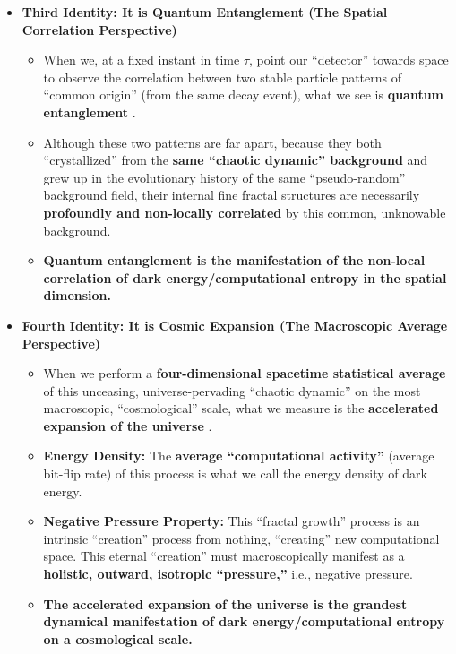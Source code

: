 \documentclass[11pt, a4paper]{article}
\begin{document}
\begin{itemize}
    \item \textbf{Third Identity: It is Quantum Entanglement (The Spatial Correlation Perspective)}
    \begin{itemize}
        \item When we, at a fixed instant in time $\tau$, point our ``detector'' towards space to observe the correlation between two stable particle patterns of ``common origin'' (from the same decay event), what we see is \textbf{quantum entanglement} \cite{Bell1964}.
        \item Although these two patterns are far apart, because they both ``crystallized'' from the \textbf{same ``chaotic dynamic'' background} and grew up in the evolutionary history of the same ``pseudo-random'' background field, their internal fine fractal structures are necessarily \textbf{profoundly and non-locally correlated} by this common, unknowable background.
        \item \textbf{Quantum entanglement is the manifestation of the non-local correlation of dark energy/computational entropy in the spatial dimension.}
    \end{itemize}

    \item \textbf{Fourth Identity: It is Cosmic Expansion (The Macroscopic Average Perspective)}
    \begin{itemize}
        \item When we perform a \textbf{four-dimensional spacetime statistical average} of this unceasing, universe-pervading ``chaotic dynamic'' on the most macroscopic, ``cosmological'' scale, what we measure is the \textbf{accelerated expansion of the universe} \cite{Planck2020}.
        \item \textbf{Energy Density:} The \textbf{average ``computational activity''} (average bit-flip rate) of this process is what we call the energy density of dark energy.
        \item \textbf{Negative Pressure Property:} This ``fractal growth'' process is an intrinsic ``creation'' process from nothing, ``creating'' new computational space. This eternal ``creation'' must macroscopically manifest as a \textbf{holistic, outward, isotropic ``pressure,''} i.e., negative pressure.
        \item \textbf{The accelerated expansion of the universe is the grandest dynamical manifestation of dark energy/computational entropy on a cosmological scale.}
    \end{itemize}
\end{itemize}
\end{document}
